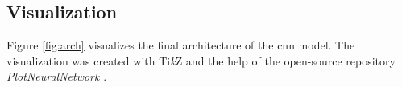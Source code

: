 \subsection{Visualization}
\label{subsec:training_of_the_cnn:architecture:visualization}
Figure \ref{fig:arch} visualizes the final architecture of the \acrshort{cnn} model.
The visualization was created with Ti\textit{k}Z and the help of the open-source repository \textit{PlotNeuralNetwork} \cite{example}.

